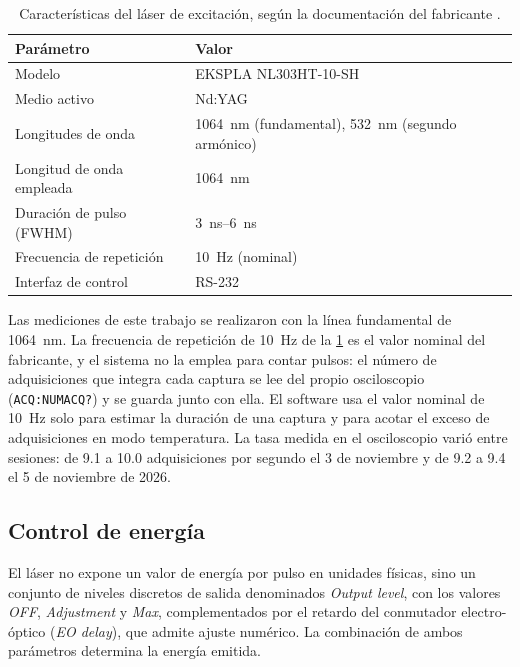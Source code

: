 \begin{table}[H]
  \centering
  \caption{Características del láser de excitación, según la
    documentación del fabricante \cite{EksplaNL300}.}
  \label{tab:laser}
  \begin{tabular}{ll}
    \toprule
    \textbf{Parámetro} & \textbf{Valor} \\
    \midrule
    Modelo & EKSPLA NL303HT-10-SH \\
    Medio activo & Nd:YAG \\
    Longitudes de onda & \SI{1064}{\nano\meter} (fundamental),
                         \SI{532}{\nano\meter} (segundo armónico) \\
    Longitud de onda empleada & \SI{1064}{\nano\meter} \\
    Duración de pulso (FWHM) & \SIrange{3}{6}{\nano\second} \\
    Frecuencia de repetición & \SI{10}{\hertz} (nominal) \\
    Interfaz de control & RS-232 \\
    \bottomrule
  \end{tabular}
\end{table}

Las mediciones de este trabajo se realizaron con la línea fundamental
de \SI{1064}{\nano\meter}. La frecuencia de repetición de
\SI{10}{\hertz} de la \cref{tab:laser} es el valor nominal del
fabricante, y el sistema no la emplea para contar pulsos: el número de
adquisiciones que integra cada captura se lee del propio osciloscopio
(\texttt{ACQ:NUMACQ?}) y se guarda junto con ella. El software usa el
valor nominal de \SI{10}{\hertz} solo para estimar la duración de una
captura y para acotar el exceso de adquisiciones en modo temperatura. La
tasa medida en el osciloscopio varió entre sesiones: de 9.1 a 10.0
adquisiciones por segundo el 3 de noviembre y de 9.2 a 9.4 el 5 de
noviembre de 2026.

\subsection*{Control de energía}

El láser no expone un valor de energía por pulso en unidades físicas,
sino un conjunto de niveles discretos de salida denominados
\textit{Output level}, con los valores \textit{OFF},
\textit{Adjustment} y \textit{Max}, complementados por el retardo del
conmutador electro-óptico (\textit{EO delay}), que admite ajuste
numérico. La combinación de ambos parámetros determina la energía
emitida.

